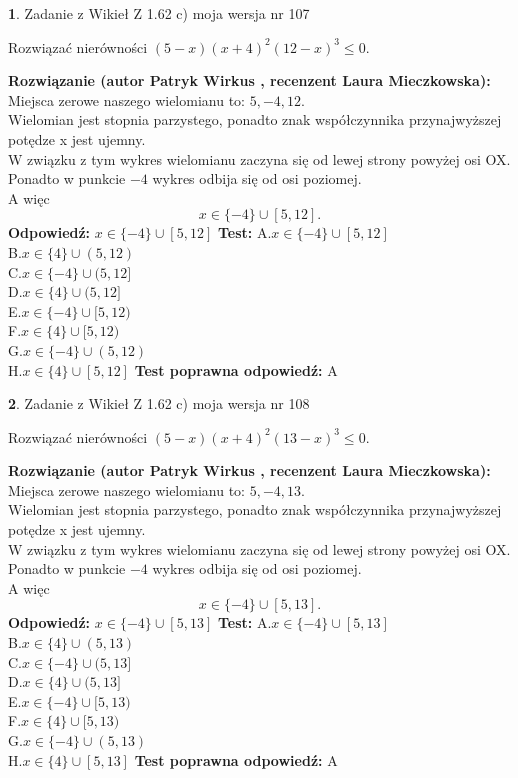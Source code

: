 \documentclass[12pt, a4paper]{article}
\theoremstyle{definition} %
\newtheorem{zad}{}
\newcommand{\zadStart}[1]{\begin{zad}#1\newline}
\newcommand{\zadStop}{\end{zad}}
\newcommand{\rozwStart}[2]{\noindent \textbf{Rozwiązanie (autor #1 , recenzent #2): }\newline}
\newcommand{\rozwStop}{\newline}
\newcommand{\odpStart}{\noindent \textbf{Odpowiedź:}\newline}
\newcommand{\odpStop}{\newline}
\newcommand{\testStart}{\noindent \textbf{Test:}\newline}
\newcommand{\testStop}{\newline}
\newcommand{\kluczStart}{\noindent \textbf{Test poprawna odpowiedź:}\newline}
\newcommand{\kluczStop}{\newline}
\begin{document}
\zadStart{Zadanie z Wikieł Z 1.62 c) moja wersja nr 107}

Rozwiązać nierówności $(5-x)(x+4)^{2}(12-x)^{3}\le0$.
\zadStop
\rozwStart{Patryk Wirkus}{Laura Mieczkowska}
Miejsca zerowe naszego wielomianu to: $5, -4, 12$.\\
Wielomian jest stopnia parzystego, ponadto znak współczynnika przy\linebreak najwyższej potędze x jest ujemny.\\ W związku z tym wykres wielomianu zaczyna się od lewej strony powyżej osi OX.\\
Ponadto w punkcie $-4$ wykres odbija się od osi poziomej.\\
A więc $$x \in \{-4\} \cup [5,12].$$
\rozwStop
\odpStart
$x \in \{-4\} \cup [5,12]$
\odpStop
\testStart
A.$x \in \{-4\} \cup [5,12]$\\
B.$x \in \{4\} \cup (5,12)$\\
C.$x \in \{-4\} \cup (5,12]$\\
D.$x \in \{4\} \cup (5,12]$\\
E.$x \in \{-4\} \cup [5,12)$\\
F.$x \in \{4\} \cup [5,12)$\\
G.$x \in \{-4\} \cup (5,12)$\\
H.$x \in \{4\} \cup [5,12]$
\testStop
\kluczStart
A
\kluczStop



\zadStart{Zadanie z Wikieł Z 1.62 c) moja wersja nr 108}

Rozwiązać nierówności $(5-x)(x+4)^{2}(13-x)^{3}\le0$.
\zadStop
\rozwStart{Patryk Wirkus}{Laura Mieczkowska}
Miejsca zerowe naszego wielomianu to: $5, -4, 13$.\\
Wielomian jest stopnia parzystego, ponadto znak współczynnika przy\linebreak najwyższej potędze x jest ujemny.\\ W związku z tym wykres wielomianu zaczyna się od lewej strony powyżej osi OX.\\
Ponadto w punkcie $-4$ wykres odbija się od osi poziomej.\\
A więc $$x \in \{-4\} \cup [5,13].$$
\rozwStop
\odpStart
$x \in \{-4\} \cup [5,13]$
\odpStop
\testStart
A.$x \in \{-4\} \cup [5,13]$\\
B.$x \in \{4\} \cup (5,13)$\\
C.$x \in \{-4\} \cup (5,13]$\\
D.$x \in \{4\} \cup (5,13]$\\
E.$x \in \{-4\} \cup [5,13)$\\
F.$x \in \{4\} \cup [5,13)$\\
G.$x \in \{-4\} \cup (5,13)$\\
H.$x \in \{4\} \cup [5,13]$
\testStop
\kluczStart
A
\kluczStop
\end{document}
